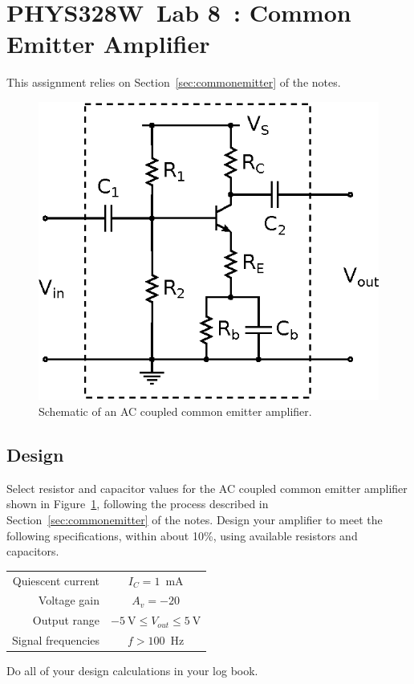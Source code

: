 \documentclass[11pt]{article}
\newcommand{\COURSE}{PHYS328W}
\newcommand{\LABNUM}{8}
\newcommand{\TITLE}{Common Emitter Amplifier}
\begin{document}
\thispagestyle{empty}

\section*{\COURSE\ Lab \LABNUM\ : \TITLE}

This assignment relies on Section~\ref{sec:commonemitter} of the notes.

\begin{figure}[ht]
  \begin{center}
    \includegraphics{commonemitter.eps}
    \caption{Schematic of an AC coupled common emitter amplifier.}
    \label{fig:commonemittercircuit}
  \end{center}
\end{figure}

\subsection*{Design}

Select resistor and capacitor values for the AC coupled common emitter
amplifier shown in Figure~\ref{fig:commonemittercircuit}, following the
process described in Section~\ref{sec:commonemitter} of the notes.
Design your amplifier to meet the following specifications, within
about 10\%, using available resistors and capacitors.
\begin{center}
\begin{tabular}{rc}
 Quiescent current & $I_C = 1$~mA \\
      Voltage gain & $A_v = -20$ \\
      Output range & $-5~\mathrm{V} \leq V_{out} \leq 5~\mathrm{V}$ \\
Signal frequencies & $f > 100$~Hz \\
\end{tabular}
\end{center}
Do all of your design calculations in your log book.
\end{document}
